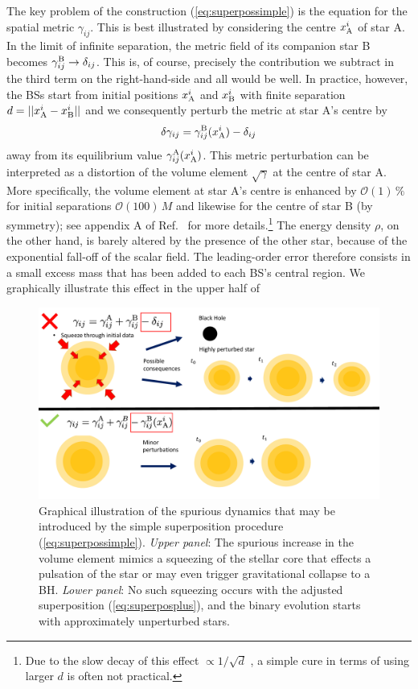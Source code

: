 \documentclass[]{iopart}
\begin{document}
The key problem of the construction (\ref{eq:superpossimple}) is
the equation for the spatial metric $\gamma_{ij}$. This is best
illustrated by considering the centre $x_{\rm A}^i$ of star A.  In
the limit of infinite separation, the metric field of its companion
star B becomes $\gamma_{ij}^{\rm B}\rightarrow \delta_{ij}$.  This
is, of course, precisely the contribution we subtract in the third
term on the right-hand-side and all would be well.  In practice,
however, the BSs start from initial positions $x_{\rm A}^i$ and
$x_{\rm B}^i$ with finite separation $d=||x_{\rm A}^i-x_{\rm B}^i||$
and we consequently perturb the metric at star A's centre by
%
\begin{equation}
  \delta \gamma_{ij} = \gamma_{ij}^{\rm B}(x^i_{\rm A})
  -\delta_{ij}
  \label{eq:metricpert}
\end{equation}
%
away from its equilibrium value $\gamma_{ij}^{\rm A}(x_{\rm A}^i)$.
This metric perturbation can be interpreted as a distortion of the
volume element $\sqrt{\gamma}$ at the centre of star A. More
specifically, the volume element at star A's centre is enhanced by
$\mathcal{O}(1)\,\%$ for initial separations $\mathcal{O}(100)\,M$
and likewise for the centre of star B (by symmetry); see appendix
A of Ref.~\cite{Helfer:2018vtq} for more details.\footnote{Due to
the slow decay of this effect $\propto 1/\sqrt{d}$ \cite{Helfer:2018vtq},
a simple cure in terms of using larger $d$ is often not practical.}
The energy density $\rho$, on the other hand, is barely altered by
the presence of the other star, because of the exponential fall-off
of the scalar field. The leading-order error therefore consists in
a small excess mass that has been added to each BS's central region.
We graphically illustrate this effect in the upper half of
%
\begin{figure}[t]
    \centering
    \includegraphics[width=350pt]{BosonStarTrick.pdf}
    \caption{
    Graphical illustration of the spurious dynamics that may be
    introduced by the simple superposition procedure
    (\ref{eq:superpossimple}). {\it Upper panel}: The spurious
    increase in the volume element mimics a squeezing of the stellar
    core that effects a pulsation of the star or may even trigger
    gravitational collapse to a BH.  {\it Lower panel}: No such
    squeezing occurs with the adjusted superposition
    (\ref{eq:superposplus}), and the binary evolution starts with
    approximately unperturbed stars.
    }
    \label{fig:Overview}
\end{figure}
\end{document}
